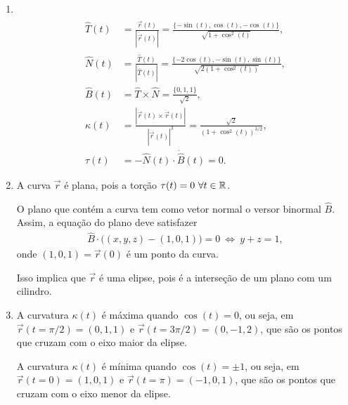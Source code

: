 \begin{questions}
\begin{solution}
\begin{enumerate}[label=(\alph*)]
    \item ~\vspace{-5mm}
    \begin{align*}
        \hat{T}(t) 
            &= \frac{\dot{\vec r}(t)}{|\dot{\vec r}(t)|}
            = \frac{\{-\sin (t),\cos (t),-\cos (t)\}}{\sqrt{1+\cos^2(t)}} , \\
        \hat{N}(t) 
            &= \frac{\dot{\hat T}(t)}{|\dot{\hat T}(t)|}
            = \frac{\{-2\cos(t), -\sin(t), \sin(t)\}}{\sqrt{2(1+\cos^2(t))}}, \\
        \hat{B}(t) 
            &= \hat{T} \times \hat{N} = \frac{\{0,1,1\}}{\sqrt{2}},\\
        \kappa(t)
            &= \frac{|\dot{\vec r}(t) \times \ddot{\vec r}(t)|}{|\dot{\vec r}(t)|^3}
            = \frac{\sqrt{2}}{(1+\cos^2(t))^{3/2}},\\
        \tau(t) 
            &= - \hat{N}(t)\cdot\dot{\hat{B}}(t) = 0.
    \end{align*}
    
    
    \item A curva $\vec r$ é plana, pois a torção $\tau(t)=0~\forall t\in{\mathbb R}$.
    
    O plano que contém a curva tem como vetor normal o versor binormal $\hat{B}$. Assim, a equação do plano deve satisfazer
    \begin{align*}
        \hat{B}\cdot\big((x,y,z)-(1,0,1)\big) = 0 
            ~\Leftrightarrow~ y + z = 1,
    \end{align*}
    onde $(1,0,1) = \vec{r}(0)$ é um ponto da curva.
    
    Isso implica que $\vec r$ é uma elipse, pois é a interseção de um plano com um cilindro.
    
    \item A curvatura $\kappa(t)$ é máxima quando $\cos(t) = 0$, ou seja, em $\vec{r}(t=\pi/2) = (0,1,1)$ e $\vec{r}(t=3\pi/2) = (0,-1,2)$, que são os pontos que cruzam com o eixo maior da elipse.
    
    A curvatura $\kappa(t)$ é mínima quando $\cos(t) = \pm1$, ou seja, em $\vec{r}(t=0) = (1,0,1)$ e $\vec{r}(t=\pi) = (-1,0,1)$, que são os pontos que cruzam com o eixo menor da elipse.
  \end{enumerate}
\end{solution}

\end{questions}
